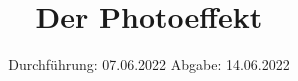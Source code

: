 

\subject{V500}
\title{Der Photoeffekt}
\date{%
  Durchführung: 07.06.2022
  \hspace{3em}
  Abgabe: 14.06.2022
}



\maketitle
\thispagestyle{empty}
\tableofcontents
\newpage







\printbibliography{}


